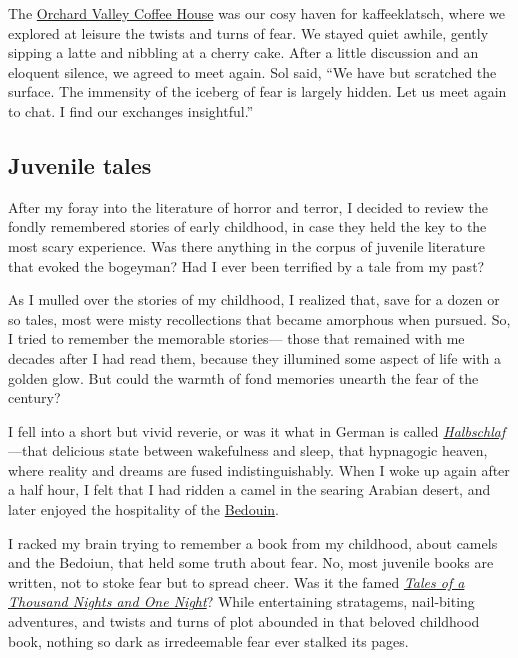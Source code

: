 \documentclass[
  a4paper,
]{article}
\begin{document}
The \href{http://www.orchardvalleycoffee.net/}{Orchard Valley Coffee
House} was our cosy haven for kaffeeklatsch, where we explored at
leisure the twists and turns of fear. We stayed quiet awhile, gently
sipping a latte and nibbling at a cherry cake. After a little discussion
and an eloquent silence, we agreed to meet again. Sol said, ``We have
but scratched the surface. The immensity of the iceberg of fear is
largely hidden. Let us meet again to chat. I find our exchanges
insightful.''

\subsection{Juvenile tales}\label{juvenile-tales}

After my foray into the literature of horror and terror, I decided to
review the fondly remembered stories of early childhood, in case they
held the key to the most scary experience. Was there anything in the
corpus of juvenile literature that evoked the bogeyman? Had I ever been
terrified by a tale from my past?

As I mulled over the stories of my childhood, I realized that, save for
a dozen or so tales, most were misty recollections that became amorphous
when pursued. So, I tried to remember the memorable stories--- those
that remained with me decades after I had read them, because they
illumined some aspect of life with a golden glow. But could the warmth
of fond memories unearth the fear of the century?

I fell into a short but vivid reverie, or was it what in German is
called
\href{https://de.pons.com/\%C3\%BCbersetzung/deutsch-englisch/Halbschlaf}{\emph{Halbschlaf}}---that
delicious state between wakefulness and sleep, that hypnagogic heaven,
where reality and dreams are fused indistinguishably. When I woke up
again after a half hour, I felt that I had ridden a camel in the searing
Arabian desert, and later enjoyed the hospitality of the
\href{https://www.newworldencyclopedia.org/entry/Bedouin}{Bedouin}.

I racked my brain trying to remember a book from my childhood, about
camels and the Bedoiun, that held some truth about fear. No, most
juvenile books are written, not to stoke fear but to spread cheer. Was
it the famed
\href{https://www.newworldencyclopedia.org/entry/The_Book_of_One_Thousand_and_One_Nights}{\emph{Tales
of a Thousand Nights and One Night}}? While entertaining stratagems,
nail-biting adventures, and twists and turns of plot abounded in that
beloved childhood book, nothing so dark as irredeemable fear ever
stalked its pages.
\end{document}
